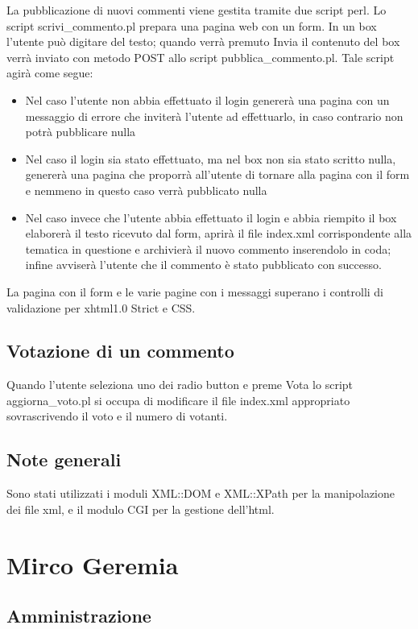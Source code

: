 \documentclass[a4paper,10pt]{article}
\begin{document}
La pubblicazione di nuovi commenti viene gestita tramite due script perl. Lo script scrivi{\_}commento.pl prepara una pagina web con un form. In un box l'utente pu\`o digitare del testo; quando verr\`a premuto Invia il contenuto del box verr\`a inviato con metodo POST allo script pubblica{\_}commento.pl. Tale script agir\`a come segue:
\begin{itemize}
\item Nel caso l'utente non abbia effettuato il login generer\`a una pagina con un messaggio di errore che inviter\`a l'utente ad effettuarlo, in caso contrario non potr\`a pubblicare nulla
\item Nel caso il login sia stato effettuato, ma nel box non sia stato scritto nulla, generer\`a una pagina che proporr\`a all'utente di tornare alla pagina con il form e nemmeno in questo caso verr\`a pubblicato nulla
\item Nel caso invece che l'utente abbia effettuato il login e abbia riempito il box elaborer\`a il testo ricevuto dal form, aprir\`a il file index.xml corrispondente alla tematica in questione e archivier\`a il nuovo commento inserendolo in coda; infine avviser\`a l'utente che il commento \`e stato pubblicato con successo.
\end{itemize}

La pagina con il form e le varie pagine con i messaggi superano i controlli di validazione per xhtml1.0 Strict e CSS.

\subsection{Votazione di un commento}

Quando l'utente seleziona uno dei radio button e preme Vota lo script aggiorna{\_}voto.pl si occupa di modificare il file index.xml appropriato sovrascrivendo il voto e il numero di votanti.

\subsection{Note generali}
Sono stati utilizzati i moduli XML::DOM e XML::XPath per la manipolazione dei file xml, e il modulo CGI per la gestione dell'html.

\section{Mirco Geremia}

\subsection{Amministrazione}
\end{document}
